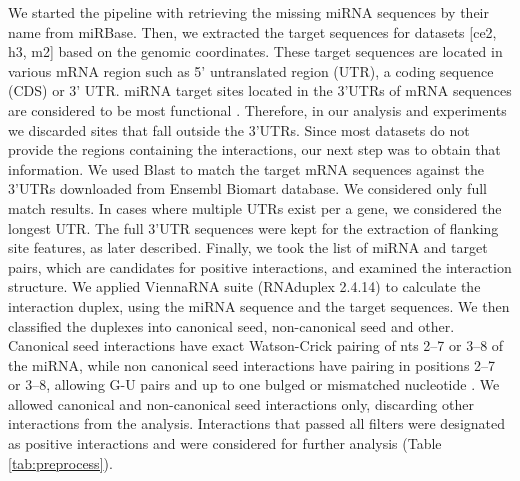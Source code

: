 \documentclass{bmcart}
\begin{document}
We started the pipeline with retrieving the missing miRNA sequences by their name from miRBase. Then, we extracted the target sequences for datasets [ce2, h3, m2] based on the genomic coordinates. These target sequences are located in various mRNA region such as 5’ untranslated region (UTR), a coding sequence (CDS) or 3’ UTR. miRNA target sites located in the 3’UTRs of mRNA sequences are considered to be most functional \cite{menor2014mirmark} . Therefore, in our analysis and experiments we discarded sites that fall outside the 3’UTRs. Since most datasets do not provide the regions containing the interactions, our next step was to obtain that information. We used Blast \cite{altschul1990basic_blast} to match the target mRNA sequences against the 3'UTRs downloaded from Ensembl Biomart database. We considered only full match results. In cases where multiple UTRs exist per a gene, we considered the longest UTR. The full 3'UTR sequences were kept for the extraction of flanking site features, as later described. Finally, we took the list of miRNA and target pairs, which are candidates for positive interactions, and examined the interaction structure. We applied ViennaRNA suite (RNAduplex 2.4.14) \cite{lorenz2011viennarna} to calculate the interaction duplex, using the miRNA sequence and the target sequences. We then classified the duplexes into canonical seed, non-canonical seed and other. Canonical seed interactions have exact Watson-Crick pairing of nts 2–7 or 3–8 of the miRNA, while non canonical seed interactions have pairing in positions 2–7 or 3–8, allowing G-U pairs and up to one bulged or mismatched nucleotide \cite{helwak2013mapping}. We allowed canonical and non-canonical seed interactions only, discarding other interactions from the analysis.
Interactions that passed all filters were designated as positive interactions and were considered for further analysis (Table \ref{tab:preprocess}).
\end{document}
